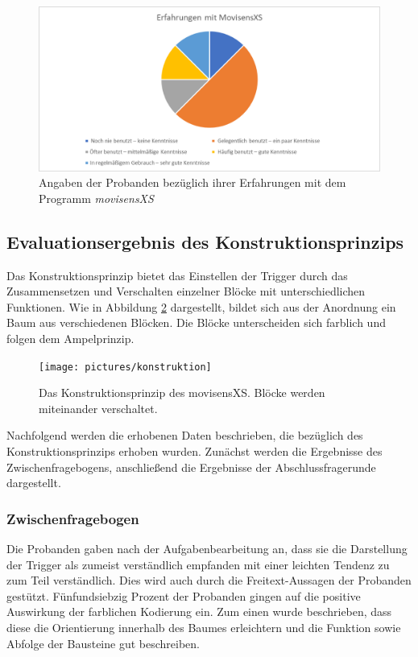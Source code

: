 \begin{figure}[h]
\centering
\includegraphics[width=1\textwidth]{pictures/diagramme/movi}
\caption{Angaben der Probanden bezüglich ihrer Erfahrungen mit dem Programm \emph{movisensXS}}
\label{movisensXSErfahrung}
\end{figure}


\subsection{Evaluationsergebnis des Konstruktionsprinzips}
Das Konstruktionsprinzip bietet das Einstellen der Trigger durch das Zusammensetzen und Verschalten einzelner Blöcke mit unterschiedlichen Funktionen. Wie in Abbildung \ref{konstruktion} dargestellt, bildet sich aus der Anordnung ein Baum aus verschiedenen Blöcken. Die Blöcke unterscheiden sich farblich und folgen dem Ampelprinzip.  

\begin{figure}[h]
\centering
\texttt{[image: pictures/konstruktion]}
\caption{Das Konstruktionsprinzip des movisensXS. Blöcke werden miteinander verschaltet.}
\label{konstruktion}
\end{figure}

Nachfolgend werden die erhobenen Daten beschrieben, die bezüglich des Konstruktionsprinzips erhoben wurden. Zunächst werden die Ergebnisse des Zwischenfragebogens, anschließend die Ergebnisse der Abschlussfragerunde dargestellt.

\subsubsection{Zwischenfragebogen}
Die Probanden gaben nach der Aufgabenbearbeitung an, dass sie die Darstellung der Trigger als zumeist verständlich empfanden mit einer leichten Tendenz zu zum Teil verständlich. Dies wird auch durch die Freitext-Aussagen der Probanden gestützt. Fünfundsiebzig Prozent der Probanden gingen auf die positive Auswirkung der farblichen Kodierung ein. Zum einen wurde beschrieben, dass diese die Orientierung innerhalb des Baumes erleichtern und die Funktion sowie Abfolge der Bausteine gut beschreiben.

